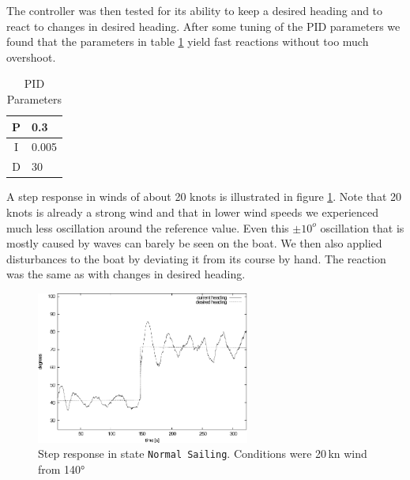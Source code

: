 The controller was then tested for its ability to keep a desired heading and to
react to changes in desired heading. After some tuning of the PID parameters we
found that the parameters in table \ref{tab:pid_params} yield fast reactions
without too much overshoot.
%
\begin{table}[htb]
\caption{PID Parameters} \label{tab:pid_params}
\centering
\begin{tabular}{c|l}\hline
P & 0.3  \\ \hline
I & 0.005 \\ \hline
D & 30 \\ \hline
\end{tabular}
\end{table}
%
A step response in winds of about 20 knots is illustrated in figure
\ref{fig:step_response_wind20kn}. Note that 20 knots is already a strong wind
and that in lower wind speeds we experienced much less oscillation around the
reference value. Even this $\pm 10^o$ oscillation that is mostly caused by
waves can barely be seen on the boat. We then also applied disturbances to the
boat by deviating it from its course by hand. The reaction was the same as with
changes in desired heading.
%
\begin{figure}[thb]
\centering
\includegraphics[trim = 0mm 0mm 0mm 0mm, clip, width=7cm]{pics/reference_step_usee4_2.pdf}
\caption{Step response in state \texttt{Normal Sailing}. Conditions were 20\,kn wind from 140°}\label{fig:step_response_wind20kn}
\end{figure}

